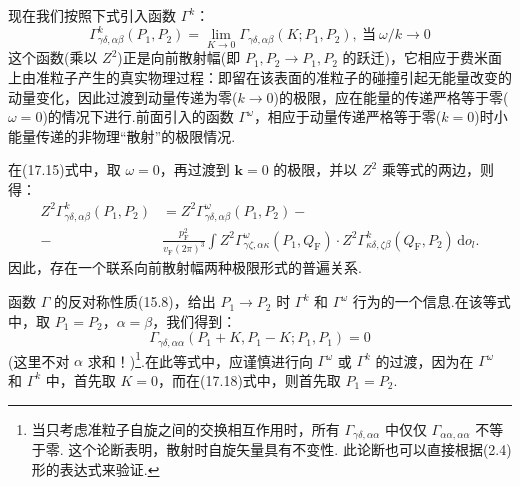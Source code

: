 现在我们按照下式引入函数 $\Gamma^k$：
\begin{equation}
  \Gamma^{k}_{\gamma\delta,\alpha\beta}(P_1,P_2)=\lim_{K\to0}\Gamma_{\gamma\delta,\alpha\beta}(K;P_1,P_2),\ \text{当}\ \omega/k\to0
\end{equation}
这个函数(乘以 $Z^2$)正是向前散射幅(即 $P_1,P_2\to P_1,P_2$ 的跃迁)，它相应于费米面上由准粒子产生的真实物理过程：即留在该表面的准粒子的碰撞引起无能量改变的动量变化，因此过渡到动量传递为零($k\to0$)的极限，应在能量的传递严格等于零($\omega=0$)的情况下进行.前面引入的函数 $\Gamma^{\omega}$，相应于动量传递严格等于零($k=0$)时小能量传递的非物理“散射”的极限情况.

在(17.15)式中，取 $\omega=0$，再过渡到 $\bm{k}=0$ 的极限，并以 $Z^2$ 乘等式的两边，则得：
\begin{equation}
\begin{aligned}
  Z^2\Gamma^{k}_{\gamma\delta,\alpha\beta}(P_1,P_2)&=Z^2\Gamma^{\omega}_{\gamma\delta,\alpha\beta}(P_1,P_2)-\\
  -{}&\frac{p_{\mathrm{F}}^2}{v_{\mathrm{F}}(2\pi)^3}\int Z^2\Gamma^{\omega}_{\gamma\zeta,\alpha\kappa}(P_1,Q_{\mathrm{F}})\cdot Z^2\Gamma^{k}_{\kappa\delta,\zeta\beta}(Q_{\mathrm{F}},P_2)\,\mathrm{d}o_l.
\end{aligned}
\end{equation}
因此，存在一个联系向前散射幅两种极限形式的普遍关系.

函数 $\Gamma$ 的反对称性质(15.8)，给出 $P_1\to P_2$ 时 $\Gamma^{k}$ 和 $\Gamma^{\omega}$ 行为的一个信息.在该等式中，取 $P_1=P_2$，$\alpha=\beta$，我们得到：
\begin{equation}
  \Gamma_{\gamma\delta,\alpha\alpha}(P_1+K,P_1-K;P_1,P_1)=0
\end{equation}
(这里不对 $\alpha$ 求和！)\footnote{当只考虑准粒子自旋之间的交换相互作用时，所有 $\Gamma_{\gamma\delta,\alpha\alpha}$ 中仅仅 $\Gamma_{\alpha\alpha,\alpha\alpha}$ 不等于零. 这个论断表明，散射时自旋矢量具有不变性. 此论断也可以直接根据(2.4)形的表达式来验证.}.在此等式中，应谨慎进行向 $\Gamma^{\omega}$ 或 $\Gamma^{k}$ 的过渡，因为在 $\Gamma^{\omega}$ 和 $\Gamma^{k}$ 中，首先取 $K=0$，而在(17.18)式中，则首先取 $P_1=P_2$.

